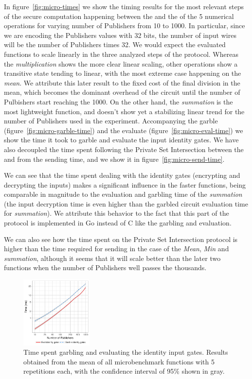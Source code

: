 In figure~\ref{fig:micro-times} we show the timing results for the most
relevant steps of the secure computation happening between the \broker and the
\garbler of the 5 numerical operations for varying number of Publishers from 10
to 1000.  In particular, since we are encoding the Publishers values with 32
bits, the number of input wires will be the number of Publishers times 32.  We
would expect the evaluated functions to scale linearly in the three analyzed
steps of the protocol.  Whereas the \emph{multiplication} shows the more clear
linear scaling, other operations show a transitive state tending to linear,
with the most extreme case happening on the \emph{mean}.  We attribute this
later result to the fixed cost of the final division in the mean, which becomes
the dominant overhead of the circuit until the number of Pulbishers start
reaching the 1000.  On the other hand, the \emph{summation} is the most
lightweight function, and doesn't show yet a stabilizing linear trend for the
number of Publishers used in the experiment.  Accompanying the garble
(figure~\ref{fig:micro-garble-time}) and the evaluate
(figure~\ref{fig:micro-eval-time}) we show the time it took to garble and
evaluate the input identity gates.  We have also decoupled the time spent
following the Private Set Intersection between the \broker and \garbler from
the sending time, and we show it in figure~\ref{fig:micro-send-time}.

We can see that the time spent dealing with the identity gates (encrypting and
decrypting the inputs) makes a significant influence in the faster functions,
being comparable in magnitude to the evaluation and garbling time of the
\emph{summation} (the input decryption time is even higher than the garbled
circuit evaluation time for \emph{summation}).  We attribute this behavior to
the fact that this part of the protocol is implemented in Go instead of C like
the garbling and evaluation.

We can also see how the time spent on the Private Set Intersection protocol is
higher than the time required for sending in the case of the \emph{Mean},
\emph{Min} and \emph{summation}, although it seems that it will scale better
than the later two functions when the number of Publishers well passes the
thousands.

\begin{figure}
  \includegraphics[width=0.32\textwidth]{plots/enc_dec.png}
  \caption{Time spent garbling and evaluating the identity input gates.
    Results obtained from the mean of all microbenchmark functions with 5
    repetitions each, with the confidence interval of 95\% shown in gray.}
  \label{micro-inputs}
\end{figure}

